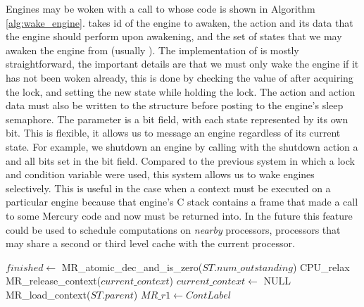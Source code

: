 Engines may be woken with a call to \wakeengine whose code is shown in
Algorithm \ref{alg:wake_engine}.
\wakeengine takes id of the engine to awaken,
the action and its data that the engine should perform upon awakening,
and the set of states that we may awaken the engine from (usually
).
The implementation of \wakeengine is mostly straightforward,
the important details are that we must only wake the engine if it has not
been woken already, this is done by checking the value of
 after acquiring the lock,
and setting the new state while holding the lock.
The action and action data must also be written to the
\enginesleepsync structure before posting to the engine's sleep
semaphore.
The parameter  is a bit field, with each state represented by
its own bit.
This is flexible, it allows us to message an engine regardless of its
current state.
For example,
we shutdown an engine by calling \wakeengine with the shutdown action a and
all bits set in the  bit field.
Compared to the previous system in which a lock and condition variable were
used,
this system allows us to wake engines selectively.
This is useful in the case when a context must be executed on a particular
engine because that engine's C stack contains a frame that made a call to
some Mercury code and now must be returned into.
In the future this feature could be used to schedule computations on
\emph{nearby} processors,
processors that may share a second or third level cache with the current
processor.

\begin{algorithm}[tbp]
\begin{algorithmic}[1]
  \State $finished \gets$ MR\_atomic\_dec\_and\_is\_zero($ST.num\_outstanding$)
        \State CPU\_relax
      \EndWhile
      \State MR\_release\_context($current\_context$)
      \State $current\_context \gets$ NULL
      \State MR\_load\_context($ST.parent$)
    \EndIf
  \Else
      \State $MR\_r1 \gets ContLabel$
    \Else
    \EndIf
  \EndIf
\EndProcedure
\end{algorithmic}
\caption{\joinandcontinue}
\label{alg:join_and_continue_ws2}
\end{algorithm}

